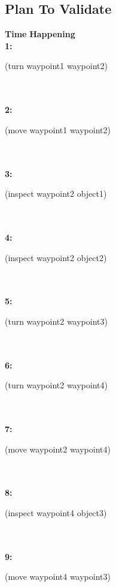\documentclass[a4paper,12pt]{article}
\newcommand{\headingtimehappening}{{\bf Time} \qquad \= {\bf Happening}\\[0.8ex]}
\newcommand{\atime}[1]{{\bf #1:}}
\newcommand{\action}[1]{{\sf #1}}
\newcommand{\listrow}[1]{\begin{minipage}[t]{11.5cm} #1 \end{minipage}}
\begin{document}
\subsection{Plan To Validate}
\begin{tabbing}
\headingtimehappening 
\atime{1}  \> \listrow{\action{(turn waypoint1 waypoint2)}}\\
\\\atime{2}  \> \listrow{\action{(move waypoint1 waypoint2)}}\\
\\\atime{3}  \> \listrow{\action{(inspect waypoint2 object1)}}\\
\\\atime{4}  \> \listrow{\action{(inspect waypoint2 object2)}}\\
\\\atime{5}  \> \listrow{\action{(turn waypoint2 waypoint3)}}\\
\\\atime{6}  \> \listrow{\action{(turn waypoint2 waypoint4)}}\\
\\\atime{7}  \> \listrow{\action{(move waypoint2 waypoint4)}}\\
\\\atime{8}  \> \listrow{\action{(inspect waypoint4 object3)}}\\
\\\atime{9}  \> \listrow{\action{(move waypoint4 waypoint3)}}\\
\end{tabbing}
\end{document}
